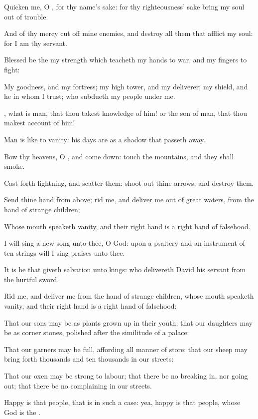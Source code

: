 \Verse Quicken me, O \LORD, for thy name's sake: for thy righteousness' sake bring my soul out of trouble.

\Verse And of thy mercy cut off mine enemies, and destroy all them that afflict my soul: for I am thy servant.




\Chapter
\Verse Blessed be the \LORD my strength which teacheth my hands to war, and my fingers to fight:

\Verse My goodness, and my fortress; my high tower, and my deliverer; my shield, and he in whom I trust; who subdueth my people under me.

\Verse \LORD, what is man, that thou takest knowledge of him! or the son of man, that thou makest account of him!

\Verse Man is like to vanity: his days are as a shadow that passeth away.

\Verse Bow thy heavens, O \LORD, and come down: touch the mountains, and they shall smoke.

\Verse Cast forth lightning, and scatter them: shoot out thine arrows, and destroy them.

\Verse Send thine hand from above; rid me, and deliver me out of great waters, from the hand of strange children;

\Verse Whose mouth speaketh vanity, and their right hand is a right hand of falsehood.

\Verse I will sing a new song unto thee, O God: upon a psaltery and an instrument of ten strings will I sing praises unto thee.

\Verse It is he that giveth salvation unto kings: who delivereth David his servant from the hurtful sword.

\Verse Rid me, and deliver me from the hand of strange children, whose mouth speaketh vanity, and their right hand is a right hand of falsehood:

\Verse That our sons may be as plants grown up in their youth; that our daughters may be as corner stones, polished after the similitude of a palace:

\Verse That our garners may be full, affording all manner of store: that our sheep may bring forth thousands and ten thousands in our streets:

\Verse That our oxen may be strong to labour; that there be no breaking in, nor going out; that there be no complaining in our streets.

\Verse Happy is that people, that is in such a case: yea, happy is that people, whose God is the \LORD.




